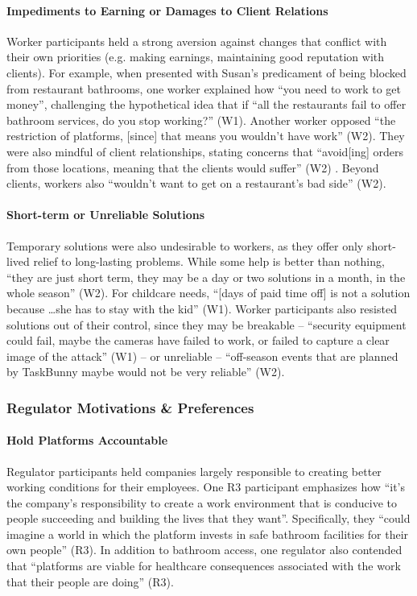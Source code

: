 \paragraph{Impediments to Earning or Damages to Client Relations}
Worker participants held a strong aversion against changes that conflict with their own priorities (e.g. making earnings, maintaining good reputation with clients). For example, when presented with Susan's predicament of being blocked from restaurant bathrooms, one worker explained how ``you need to work to get money'', challenging the hypothetical idea that if ``all the restaurants fail to offer bathroom services, do you stop working?'' (W1). Another worker opposed ``the restriction of platforms, [since] that means you wouldn't have work'' (W2). They were also mindful of client relationships, stating concerns that ``avoid[ing] orders from those locations, meaning that the clients would suffer'' (W2)%
. Beyond clients, workers also ``wouldn't want to get on a restaurant's bad side'' (W2).



\paragraph{Short-term or Unreliable Solutions}
Temporary solutions were also undesirable to workers, as they offer only short-lived relief to long-lasting problems. While some help is better than nothing, ``they are just short term, they may be a day or two solutions in a month, in the whole season'' (W2). For childcare needs, ``[days of paid time off] is not a solution because \dots she has to stay with the kid'' (W1). Worker participants also resisted solutions out of their control, since they may be breakable -- ``security equipment could fail, maybe the cameras have failed to work, or failed to capture a clear image of the attack'' (W1) -- or unreliable -- ``off-season events that are planned by TaskBunny maybe would not be very reliable'' (W2).

\subsubsection{Regulator Motivations \& Preferences}
\paragraph{Hold Platforms Accountable}
Regulator participants held companies largely responsible to creating better working conditions for their employees. One R3 participant emphasizes how ``it's the company's responsibility to create a work environment that is conducive to people succeeding and building the lives that they want''. Specifically, they ``could imagine a world in which the platform invests in safe bathroom facilities for their own people'' (R3). In addition to bathroom access, one regulator also contended that ``platforms are viable for healthcare consequences associated with the work that their people are doing'' (R3).

